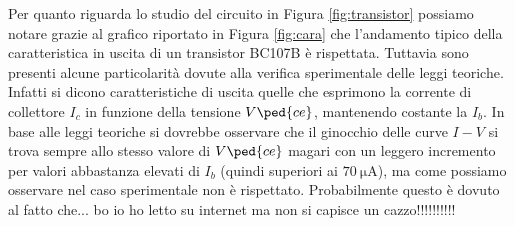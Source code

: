 Per quanto riguarda lo studio del circuito in Figura \ref{fig:transistor} possiamo notare grazie al grafico riportato in Figura \ref{fig:cara} che l'andamento tipico della caratteristica in uscita di un transistor BC107B è rispettata. Tuttavia sono presenti alcune particolarità dovute alla verifica sperimentale delle leggi teoriche. Infatti si dicono caratteristiche di uscita quelle che esprimono la corrente di collettore $I_c$ in funzione della tensione $V\ped{ce}$, mantenendo costante la $I_b$.
In base alle leggi teoriche si dovrebbe osservare che il ginocchio delle curve $I-V$ si trova sempre allo stesso valore di $V\ped{ce}$ magari con un leggero incremento per valori abbastanza elevati di $I_b$ (quindi superiori ai $\SI{70}{\micro\ampere}$), ma come possiamo osservare nel caso sperimentale non è rispettato. Probabilmente questo è dovuto al fatto che... bo io ho letto su internet ma non si capisce un cazzo!!!!!!!!!!
